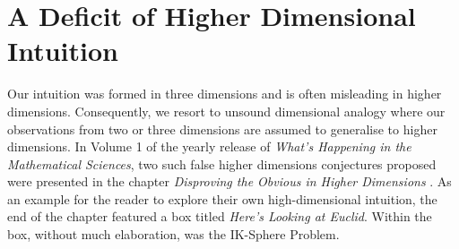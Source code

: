 \section{A Deficit of Higher Dimensional Intuition}
Our intuition was formed in three dimensions and is often misleading in higher dimensions. Consequently, we resort to unsound dimensional analogy where our observations from two or three dimensions are assumed to generalise to higher dimensions. In Volume 1 of the yearly release of \textit{What’s Happening in the Mathematical Sciences}, two such false higher dimensions conjectures proposed were presented in the chapter \textit{Disproving the Obvious in Higher Dimensions} \cite{Cipra_1993}. As an example for the reader to explore their own high-dimensional intuition, the end of the chapter featured a box titled \textit{Here's Looking at Euclid}. Within the box, without much elaboration, was the IK-Sphere Problem.

